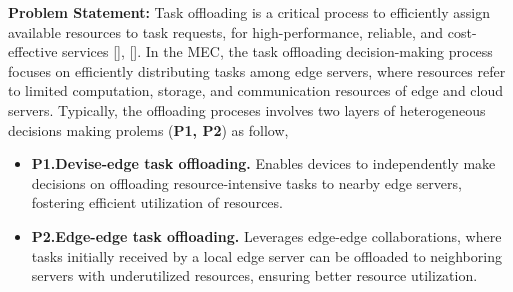 \documentclass[12pt]{article}
\begin{document}




\vspace{2mm}

\noindent\textbf{\large Problem Statement: }
\noindent
Task offloading is a critical process to efficiently assign available resources to task requests, for high-performance, reliable, and cost-effective services [], []. In the MEC, the task offloading decision-making process focuses on efficiently distributing tasks among edge servers, where resources refer to limited computation, storage, and communication resources of edge and cloud servers. Typically, the offloading proceses involves two layers of heterogeneous decisions making prolems (\textbf{P1, P2}) as follow,
\vspace{-2mm}
\begin{itemize}
	\item\textbf{P1.\hspace{2mm}Devise-edge task offloading.} Enables devices to independently make decisions on offloading resource-intensive tasks to nearby edge servers, fostering efficient utilization of resources.\vspace{-2mm}
	\item\textbf{P2.\hspace{2mm}Edge-edge task offloading.} Leverages edge-edge collaborations, where tasks initially received by a local edge server can be offloaded to neighboring servers with underutilized resources, ensuring better resource utilization. %
\end{itemize}
\end{document}
